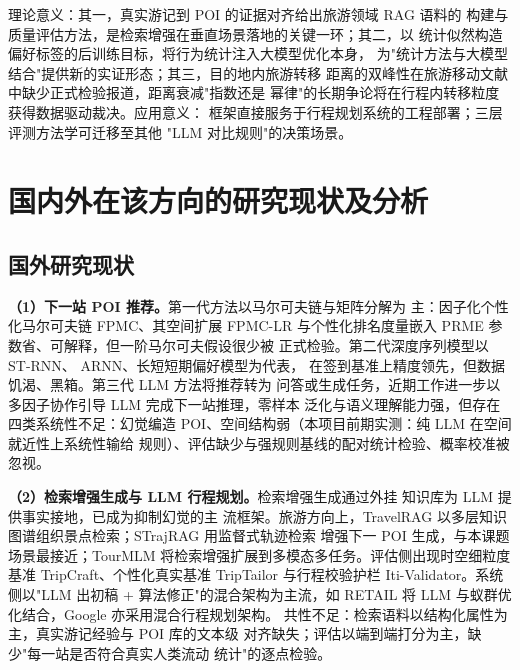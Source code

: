 理论意义：其一，真实游记到 POI 的证据对齐给出旅游领域 RAG 语料的
构建与质量评估方法，是检索增强在垂直场景落地的关键一环；其二，以
统计似然构造偏好标签的后训练目标，将行为统计注入大模型优化本身，
为"统计方法与大模型结合"提供新的实证形态；其三，目的地内旅游转移
距离的双峰性在旅游移动文献中缺少正式检验报道，距离衰减"指数还是
幂律"的长期争论将在行程内转移粒度获得数据驱动裁决。应用意义：
框架直接服务于行程规划系统的工程部署；三层评测方法学可迁移至其他
"LLM 对比规则"的决策场景。

\section{国内外在该方向的研究现状及分析}

\subsection{国外研究现状}

\textbf{（1）下一站 POI 推荐。}第一代方法以马尔可夫链与矩阵分解为
主：因子化个性化马尔可夫链 FPMC\cite{rendle2010fpmc}、其空间扩展
FPMC-LR\cite{cheng2013fpmclr} 与个性化排名度量嵌入
PRME\cite{feng2015prme} 参数省、可解释，但一阶马尔可夫假设很少被
正式检验。第二代深度序列模型以 ST-RNN\cite{liu2016strnn}、
ARNN\cite{liu2019arnn}、长短短期偏好模型\cite{li2022lstpm}为代表，
在签到基准上精度领先，但数据饥渴、黑箱。第三代 LLM 方法将推荐转为
问答或生成任务\cite{li2024llmpoi,wu2024llm4rec}，近期工作进一步以
多因子协作引导 LLM 完成下一站推理\cite{song2026mfc4poi}，零样本
泛化与语义理解能力强，但存在四类系统性不足：幻觉编造
POI、空间结构弱（本项目前期实测：纯 LLM 在空间就近性上系统性输给
规则）、评估缺少与强规则基线的配对统计检验、概率校准被
忽视\cite{guo2017calibration}。

\textbf{（2）检索增强生成与 LLM 行程规划。}检索增强生成通过外挂
知识库为 LLM 提供事实接地\cite{lewis2020rag}，已成为抑制幻觉的主
流框架。旅游方向上，TravelRAG\cite{song2024travelrag} 以多层知识
图谱组织景点检索；STrajRAG\cite{lin2025strajrag} 用监督式轨迹检索
增强下一 POI 生成，与本课题场景最接近；TourMLM\cite{yamanishi2025tourmlm}
将检索增强扩展到多模态多任务。评估侧出现时空细粒度基准
TripCraft\cite{chaudhuri2025tripcraft}、个性化真实基准
TripTailor\cite{wang2025triptailor} 与行程校验护栏
Iti-Validator\cite{gadbail2025validator}。系统侧以"LLM 出初稿 +
算法修正"的混合架构为主流，如 RETAIL\cite{deng2025retail} 将 LLM
与蚁群优化结合，Google 亦采用混合行程规划架构\cite{google2025trip}。
共性不足：检索语料以结构化属性为主，真实游记经验与 POI 库的文本级
对齐缺失；评估以端到端打分为主，缺少"每一站是否符合真实人类流动
统计"的逐点检验。

